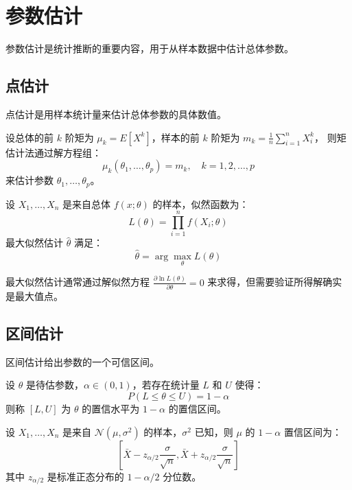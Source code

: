 \section{参数估计}\label{sec:parameter-estimation}

参数估计是统计推断的重要内容，用于从样本数据中估计总体参数。

\subsection{点估计}

点估计是用样本统计量来估计总体参数的具体数值。

\begin{definition}[矩估计法]\label{def:method-of-moments}
设总体的前 $k$ 阶矩为 $\mu_k = E[X^k]$，样本的前 $k$ 阶矩为 $m_k = \frac{1}{n}\sum_{i=1}^n X_i^k$，
则矩估计法通过解方程组：
\[
\mu_k(\theta_1, \ldots, \theta_p) = m_k, \quad k = 1, 2, \ldots, p
\]
来估计参数 $\theta_1, \ldots, \theta_p$。
\end{definition}

\begin{definition}[最大似然估计]\label{def:mle}
设 $X_1, \ldots, X_n$ 是来自总体 $f(x; \theta)$ 的样本，似然函数为：
\[
L(\theta) = \prod_{i=1}^n f(X_i; \theta)
\]
最大似然估计 $\hat{\theta}$ 满足：
\[
\hat{\theta} = \arg\max_{\theta} L(\theta)
\]
\end{definition}

\begin{warningbox}[title=注意事项]
最大似然估计通常通过解似然方程 $\frac{\partial \ln L(\theta)}{\partial \theta} = 0$ 来求得，但需要验证所得解确实是最大值点。
\end{warningbox}

\subsection{区间估计}

区间估计给出参数的一个可信区间。

\begin{definition}[置信区间]\label{def:confidence-interval}
设 $\theta$ 是待估参数，$\alpha \in (0, 1)$，若存在统计量 $L$ 和 $U$ 使得：
\[
P(L \leq \theta \leq U) = 1 - \alpha
\]
则称 $[L, U]$ 为 $\theta$ 的置信水平为 $1-\alpha$ 的置信区间。
\end{definition}

\begin{example}[正态总体均值的置信区间]\label{ex:confidence-interval-normal}
设 $X_1, \ldots, X_n$ 是来自 $\mathcal{N}(\mu, \sigma^2)$ 的样本，$\sigma^2$ 已知，则 $\mu$ 的 $1-\alpha$ 置信区间为：
\[
\left[\bar{X} - z_{\alpha/2}\frac{\sigma}{\sqrt{n}}, \bar{X} + z_{\alpha/2}\frac{\sigma}{\sqrt{n}}\right]
\]
其中 $z_{\alpha/2}$ 是标准正态分布的 $1-\alpha/2$ 分位数。
\end{example}

